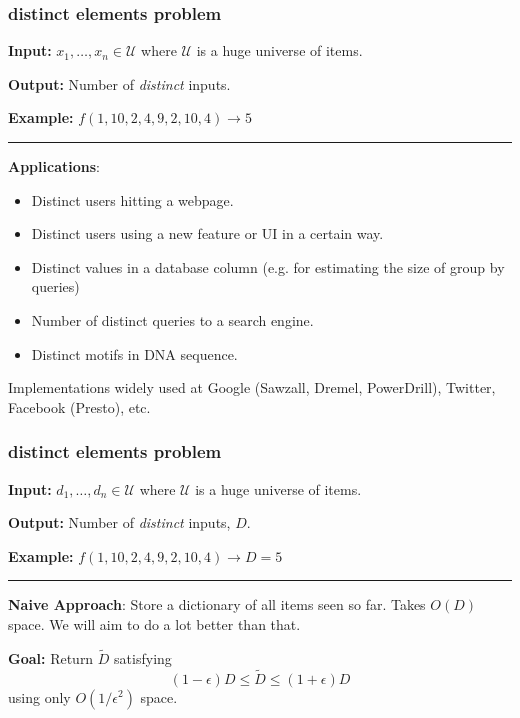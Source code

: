 \documentclass[handout,compress]{beamer}
\begin{document}
\begin{frame}
	\frametitle{distinct elements problem}
	\textbf{Input:} $x_1, \ldots, x_n \in \mathcal{U}$ where $\mathcal{U}$ is a huge universe of items. 
	
	\textbf{Output:} Number of \emph{distinct} inputs.
	
	\textbf{Example:} $f(1, 10, 2, 4, 9, 2, 10, 4) \rightarrow 5$
	
	\vspace{.5em}
	\hrule
	\vspace{.5em}
	
		\textbf{Applications}:
			\begin{itemize}
				\item Distinct users hitting a webpage. 
				\item Distinct users using a new feature or UI in a certain way.
				\item Distinct values in a database column (e.g. for estimating the size of group by queries)
				\item Number of distinct queries to a search engine.
				\item Distinct motifs in DNA sequence.
			\end{itemize}
		Implementations widely used at Google (Sawzall, Dremel, PowerDrill), Twitter, Facebook (Presto), etc. 
\end{frame}

\begin{frame}[t]
	\frametitle{distinct elements problem}
	\textbf{Input:} $d_1, \ldots, d_n \in \mathcal{U}$ where $\mathcal{U}$ is a huge universe of items. 
	
	\textbf{Output:} Number of \emph{distinct} inputs, $D$.
	
	\textbf{Example:} $f(1, 10, 2, 4, 9, 2, 10, 4) \rightarrow D = 5$
	
	\vspace{.5em}
	\hrule
	\vspace{.5em}
	
	\textbf{Naive Approach}:
	Store a dictionary of all items seen so far. Takes $O(D)$ space. We will aim to do a lot better than that. 
	
	\vspace{1em}
	\textbf{Goal:} Return $\tilde{D}$ satisfying $$(1-\epsilon) D \leq \tilde{D} \leq (1+\epsilon) D$$ using only $O(1/\epsilon^2)$ space.

\end{frame}
\end{document}
